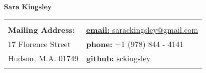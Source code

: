 \documentclass[letterpaper,11pt,oneside]{article}
\begin{document}

\noindent  \LARGE{\textbf{Sara Kingsley}}  \\
\vspace{-2ex}
\hline 
\normalsize

\begin{center}
\begin{tabular}{@{}  l l}
& \\
\textbf{Mailing Address:}    & \hspace{1in} \href{mailto:sarackingsley@gmail.com}{\textbf{email:} sarackingsley@gmail.com} \\
 17 Florence Street    & \hspace{1in} \textbf{phone:} +1 (978) 844 - 4141 \\
 Hudson, M.A.  01749    & \hspace {1in}
 \href{https://sckingsley.github.io}{\textbf{github:} sckingsley}   \\  
 & \\
\end{tabular}
\end{center}

\vspace{1em}

\end{document}
